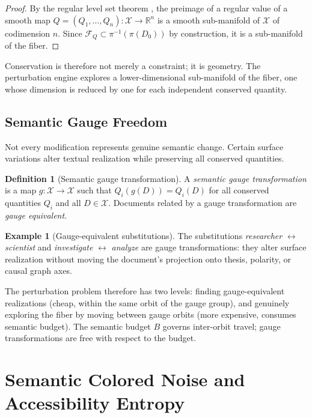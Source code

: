 \documentclass[12pt, a4paper]{article}
\theoremstyle{plain}
\theoremstyle{definition}
\newtheorem{definition}[theorem]{Definition}
\newtheorem{example}[theorem]{Example}
\theoremstyle{remark}
\newcommand{\calX}{\mathcal{X}}
\newcommand{\calF}{\mathcal{F}}
\newcommand{\bR}{\mathbb{R}}
\newcommand{\vpi}{\pi}
\newcommand{\fiber}[1]{\vpi^{-1}(#1)}
\begin{document}
\begin{proof}
By the regular level set theorem \cite{lee2013smooth}, the preimage of a
regular value of a smooth map $Q = (Q_1, \ldots, Q_n) : \calX \to \bR^n$
is a smooth sub-manifold of $\calX$ of codimension $n$.  Since $\calF_Q
\subset \fiber{\vpi(D_0)}$ by construction, it is a sub-manifold of the fiber.
\end{proof}

Conservation is therefore not merely a constraint; it is geometry.  The
perturbation engine explores a lower-dimensional sub-manifold of the fiber,
one whose dimension is reduced by one for each independent conserved quantity.

\subsection{Semantic Gauge Freedom}

Not every modification represents genuine semantic change.  Certain surface
variations alter textual realization while preserving all conserved quantities.

\begin{definition}[Semantic gauge transformation]
\label{def:gauge}
A \emph{semantic gauge transformation} is a map $g : \calX \to \calX$ such that
$Q_i(g(D)) = Q_i(D)$ for all conserved quantities $Q_i$ and all $D \in \calX$.
Documents related by a gauge transformation are \emph{gauge equivalent}.
\end{definition}

\begin{example}[Gauge-equivalent substitutions]
The substitutions \emph{researcher} $\leftrightarrow$ \emph{scientist} and
\emph{investigate} $\leftrightarrow$ \emph{analyze} are gauge transformations:
they alter surface realization without moving the document's projection onto
thesis, polarity, or causal graph axes.
\end{example}

The perturbation problem therefore has two levels: finding gauge-equivalent
realizations (cheap, within the same orbit of the gauge group), and genuinely
exploring the fiber by moving between gauge orbits (more expensive, consumes
semantic budget).  The semantic budget $B$ governs inter-orbit travel; gauge
transformations are free with respect to the budget.


\section{Semantic Colored Noise and Accessibility Entropy}
\label{sec:colorednoise}
\end{document}
